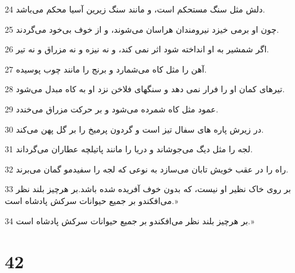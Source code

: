 \par 24 دلش مثل سنگ مستحکم است، و مانند سنگ زیرین آسیا محکم می‌باشد.
\par 25 چون او برمی خیزد نیرومندان هراسان می‌شوند، و از خوف بی‌خود می‌گردند.
\par 26 اگر شمشیر به او انداخته شود اثر نمی کند، و نه نیزه و نه مزراق و نه تیر.
\par 27 آهن را مثل کاه می‌شمارد و برنج را مانند چوب پوسیده.
\par 28 تیرهای کمان او را فرار نمی دهد و سنگهای فلاخن نزد او به کاه مبدل می‌شود.
\par 29 عمود مثل کاه شمرده می‌شود و بر حرکت مزراق می‌خندد.
\par 30 در زیرش پاره های سفال تیز است و گردون پرمیخ را بر گل پهن می‌کند.
\par 31 لجه را مثل دیگ می‌جوشاند و دریا را مانند پاتیلچه عطاران می‌گرداند.
\par 32 راه را در عقب خویش تابان می‌سازد به نوعی که لجه را سفیدمو گمان می‌برند.
\par 33 بر روی خاک نظیر او نیست، که بدون خوف آفریده شده باشد.بر هرچیز بلند نظر می‌افکندو بر جمیع حیوانات سرکش پادشاه است.»
\par 34 بر هرچیز بلند نظر می‌افکندو بر جمیع حیوانات سرکش پادشاه است.»
 
\chapter{42}

